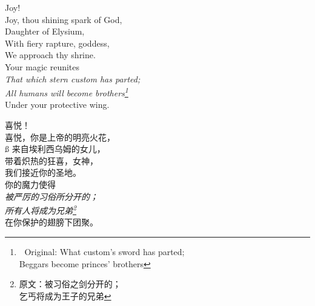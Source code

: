 \begin{paracol}{4}
\begin{Everse}
Joy! \\
Joy, thou shining spark of God,\\
Daughter of Elysium,\\
With fiery rapture, goddess,\\
We approach thy shrine.\\
Your magic reunites\\
{\itshape That which stern custom has parted;\\
All humans will become brothers\footnote{
Original: 
What custom's sword has parted;\\
Beggars become princes' brothers}}\\
Under your protective wing.
\end{Everse}
\begin{CEverse}
喜悦！ \\
喜悦，你是上帝的明亮火花，\\ß
来自埃利西乌姆的女儿，\\
带着炽热的狂喜，女神，\\
我们接近你的圣地。\\
你的魔力使得\\
{\itshape 被严厉的习俗所分开的；\\
所有人将成为兄弟\footnote{原文：被习俗之剑分开的；\\
乞丐将成为王子的兄弟}}\\
在你保护的翅膀下团聚。
\end{CEverse}


\end{paracol}
